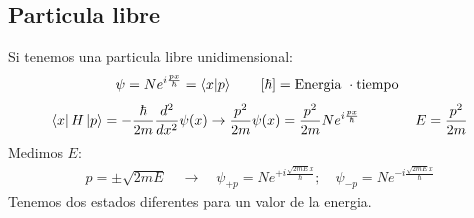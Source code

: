 \documentclass{article}
\begin{document}
\hfill 

\hfill 

\hfill 

\subsection{Particula libre}

Si tenemos una particula libre unidimensional: 
\begin{gather*}
  \psi = N e ^ {i \frac{px }{\hbar }} = \bra{x}\ket{p }   \qquad [\hbar ] = \text{Energia }\cdot \text{tiempo }
\end{gather*}
\begin{gather*}
  \bra{x }H \ket{p } = - \frac{\hbar }{2m }\frac{d ^2 }{d x ^2} \psi(x) \rightarrow \frac{p ^2}{2m }\psi(x) = \frac{p ^2}{2m } N e ^ {i \frac{px }{\hbar }} \qquad \qquad E =  \frac{p ^2}{2m }  
\end{gather*}
Medimos $ E  $: 
\begin{gather*}
  p = \pm\sqrt{2m E} \quad \rightarrow \quad \psi _{+p } = N e ^ { + i \frac{\sqrt{2mE } x }{\hbar }}; \quad \psi _{-p } = N e ^ {-i \frac{\sqrt{2mE } x }{\hbar }}
\end{gather*}
Tenemos dos estados diferentes para un valor de la energia.
\end{document}
